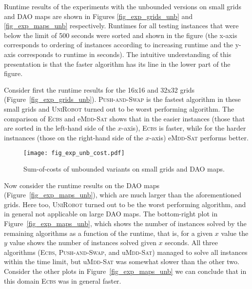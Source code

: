 \documentclass[letterpaper]{article}
\begin{document}
Runtime results of the experiments with the unbounded versions on small grids
and DAO maps are shown in Figures \ref{fig_exp_grids_unb} and
\ref{fig_exp_maps_unb} respectively. Runtimes for all testing instances that
were below the limit of 500 seconds were sorted and shown in the figure (the
x-axis corresponds to ordering of instances according to increasing runtime and
the y-axis corresponds to runtime in seconds). The intuitive understanding of
this presentation is that the faster algorithm has its line in the lower
part of the figure. 

Consider first the runtime results for the 16x16 and 32x32 grids (Figure~\ref{fig_exp_grids_unb}). 
\textsc{Push-and-Swap} is the fastest algorithm in these small grids and \textsc{UniRobot} turned out to be worst performing algorithm. The comparison of \textsc{Ecbs} and e\textsc{Mdd-Sat} shows that in the easier instances (those that are sorted in the left-hand side of the $x$-axis),  \textsc{Ecbs} is faster, while for the harder instnances (those on the right-hand side of the $x$-axis)
e\textsc{Mdd-Sat} performs better. 

\begin{figure}[h]
\texttt{[image: fig\_exp\_unb\_cost.pdf]}
\caption{Sum-of-costs of unbounded variants on small grids and DAO maps.}
\label{fig_exp_unb_cost}
\end{figure}

Now consider the runtime results on the DAO maps (Figure~\ref{fig_exp_maps_unb}), which are much larger than the aforementioned grids. Here too, \textsc{UniRobot} turned out to be the worst performing algorithm, 
and in general not applicable on large DAO maps. 
The bottom-right plot in Figure~\ref{fig_exp_maps_unb}, 
which shows the number of instances solved by the remaining algorithms as a function of the runtime, 
that is, for a given $x$ value the $y$ value shows the number of instances solved 
given $x$ seconds. All three algorithms (\textsc{Ecbs}, \textsc{Push-and-Swap}, and u\textsc{Mdd-Sat}) managed to solve all instances within the time limit, 
but u\textsc{Mdd-Sat} was somewhat slower than the other two. 
Consider the other plots in Figure~\ref{fig_exp_maps_unb} we can conclude that in this domain
\textsc{Ecbs} was in general faster.
\end{document}
